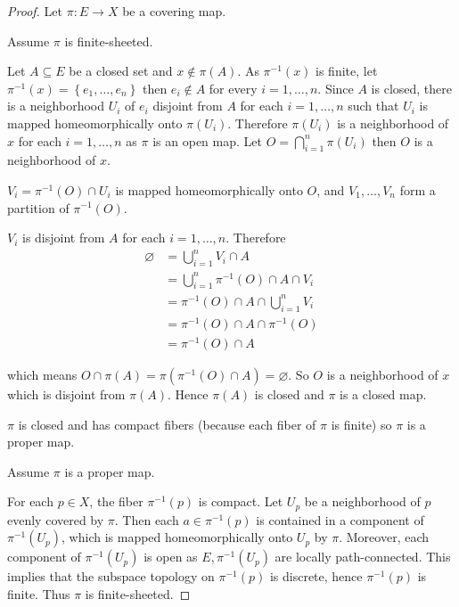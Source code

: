 \begin{proof}
    Let \( \pi: E \to X \) be a covering map.

    Assume \( \pi \) is finite-sheeted.

    Let \( A \subseteq E \) be a closed set and \( x \notin \pi(A) \). As \( \pi^{-1}(x) \) is finite, let \( \pi^{-1}(x) = \left\{ e_{1}, \ldots, e_{n} \right\} \) then \( e_{i} \notin A \) for every \( i = 1, \ldots, n \). Since \( A \) is closed, there is a neighborhood \( U_{i} \) of \( e_{i} \) disjoint from \( A \) for each \( i = 1, \ldots, n \) such that \( U_{i} \) is mapped homeomorphically onto \( \pi(U_{i}) \). Therefore \( \pi(U_{i}) \) is a neighborhood of \( x \) for each \( i = 1, \ldots, n \) as \( \pi \) is an open map. Let \( O = \bigcap_{i=1}^{n} \pi(U_{i}) \) then \( O \) is a neighborhood of \( x \).

    \( V_{i} = \pi^{-1}(O) \cap U_{i} \) is mapped homeomorphically onto \( O \), and \( V_{1}, \ldots, V_{n} \) form a partition of \( \pi^{-1}(O) \).

    \( V_{i}  \) is disjoint from \( A \) for each \( i = 1, \ldots, n \). Therefore
    \begingroup
    \allowdisplaybreaks%
    \begin{align*}
        \varnothing & = \bigcup_{i=1}^{n} V_{i} \cap A                  \\
                    & = \bigcup_{i=1}^{n} \pi^{-1}(O) \cap A \cap V_{i} \\
                    & = \pi^{-1}(O) \cap A \cap \bigcup_{i=1}^{n} V_{i} \\
                    & = \pi^{-1}(O) \cap A \cap \pi^{-1}(O)             \\
                    & = \pi^{-1}(O) \cap A
    \end{align*}
    \endgroup

    which means \( O \cap \pi(A) = \pi(\pi^{-1}(O) \cap A) = \varnothing \). So \( O \) is a neighborhood of \( x \) which is disjoint from \( \pi(A) \). Hence \( \pi(A) \) is closed and \( \pi \) is a closed map.

    \( \pi \) is closed and has compact fibers (because each fiber of \(\pi\) is finite) so \( \pi \) is a proper map.

    \hrulefill%

    Assume \( \pi \) is a proper map.

    For each \( p \in X \), the fiber \( \pi^{-1}(p) \) is compact. Let \( U_{p} \) be a neighborhood of \( p \) evenly covered by \( \pi \). Then each \( a \in \pi^{-1}(p) \) is contained in a component of \( \pi^{-1}(U_{p}) \), which is mapped homeomorphically onto \( U_{p} \) by \( \pi \). Moreover, each component of \( \pi^{-1}(U_{p}) \) is open as \( E, \pi^{-1}(U_{p}) \) are locally path-connected. This implies that the subspace topology on \( \pi^{-1}(p) \) is discrete, hence \( \pi^{-1}(p) \) is finite. Thus \( \pi \) is finite-sheeted.
\end{proof}

